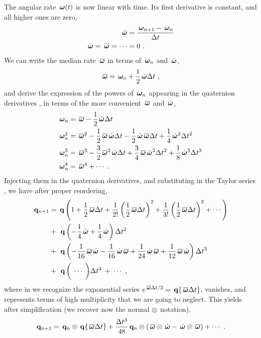 The angular rate $\,{\bm \omega}(t)$ is now linear with time. Its first derivative is constant, and all higher ones are zero,
%
%
\begin{align}
\,\dot{{\bm \omega}} &= \frac{\,{\bm \omega}_{n+1}-\,{\bm \omega}_n}{\Delta t} \label{equ:wdot} \\
\ddot{\,{\bm \omega}} = \dddot{\,{\bm \omega}} = \cdots &= 0 \label{equ:wddot}
~.
\end{align}%
%
We can write the median rate $\,\overline{{\bm \omega}}$ in terms of $\,{\bm \omega}_n$ and $\,\dot{{\bm \omega}}$,
%
\begin{align}
\,\overline{{\bm \omega}} = \,{\bm \omega}_n+\frac12\,\dot{{\bm \omega}}\Delta t~,
\end{align}
%
and derive the expression of the powers of $\,{\bm \omega}_n$ appearing in the quaternion derivatives , in terms of the more convenient $\,\overline{{\bm \omega}}$ and $\,\dot{{\bm \omega}}$, 
%
\begin{subequations}
%
\begin{align}
\,{\bm \omega}_n &= \,\overline{{\bm \omega}}-\frac12\,\dot{{\bm \omega}}\Delta t \label{equ:wone}\\
\,{\bm \omega}_n^2 &= \,\overline{{\bm \omega}}^2 - \frac12\,\overline{{\bm \omega}}\,\dot{{\bm \omega}}\Delta t - \frac12\,\dot{{\bm \omega}}\,\overline{{\bm \omega}}\Delta t + \frac14\,\dot{{\bm \omega}}^2\Delta t^2 \\
\,{\bm \omega}_n^3 &= \,\overline{{\bm \omega}}^3 - \frac32\,\overline{{\bm \omega}}^2\,\dot{{\bm \omega}}\Delta t + \frac34\,\overline{{\bm \omega}}\,\dot{{\bm \omega}}^2\Delta t^2 + \frac18\,\dot{{\bm \omega}}^3\Delta t^3 \\
\,{\bm \omega}_n^4 &= \,\overline{{\bm \omega}}^4 + \cdots \label{equ:wthree}
~.
\end{align}%
\end{subequations}
%
Injecting them in the quaternion derivatives, and substituting in the Taylor series , we have after proper reordering,
%
\begin{subequations}
%
\begin{align}
\q_{n+1} 
\e
\q\left(1+\frac12\aw\Dt+\frac1{2!}\left(\frac12\aw\Dt\right)^2+\frac1{3!}\left(\frac12\aw\Dt\right)^3+\cdots\right) \label{equ:exp} \\
&+\: \q\left(-\frac14\dw + \frac14\dw \right)\Dt^2 \label{equ:vanish}\\
&+\: \q\left(-\frac1{16}\aw\dw - \frac1{16}\dw\aw + \frac1{24}\dw\aw + \frac1{12}\aw\dw\right)\Dt^3 \label{equ:bracket} \\
&+\: \q\,\bigg(\:\cdots\:\bigg)\Dt^4 \:+\: \cdots 
\label{equ:neglected}
~,
\end{align}%
\end{subequations}
%
where in  we recognize the exponential series $e^{\,\overline{{\bm \omega}}\Delta t/2}= \,{\bf q}\{\,\overline{{\bm \omega}}\Delta t\}$,  vanishes, and  represents terms of high multiplicity that we are going to neglect. 
%
This yields after simplification  (we recover now the normal $\otimes$ notation),
%
\begin{align}
\,{\bf q}_{n+1} = \,{\bf q}_n\otimes\,{\bf q}\{\,\overline{{\bm \omega}}\Delta t\} + \frac{\Delta t^3}{48}\,{\bf q}_n\otimes(\,\overline{{\bm \omega}}\otimes\,\dot{{\bm \omega}} - \,\dot{{\bm \omega}}\otimes\,\overline{{\bm \omega}}) + \cdots ~.
\end{align}
